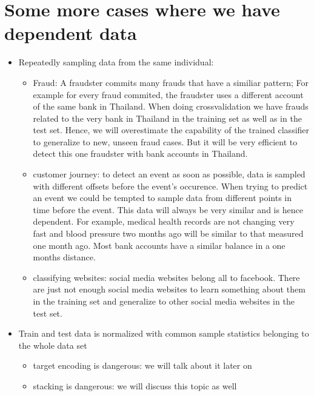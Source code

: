 \documentclass[letterpaper,10pt,english]{jupyterBook}
\begin{document}
\section{Some more cases where we have dependent data}
\label{\detokenize{dependent_data:some-more-cases-where-we-have-dependent-data}}\begin{itemize}
\item {} 
\sphinxAtStartPar
Repeatedly sampling data from the same individual:
\begin{itemize}
\item {} 
\sphinxAtStartPar
Fraud: A fraudster commits many frauds that have a similiar pattern; For example for every fraud commited, the fraudster uses a different account of the same bank in Thailand. When doing cross\sphinxhyphen{}validation we have frauds related to the very bank in Thailand in the training set as well as in the test set. Hence, we will overestimate the capability of the trained classifier to generalize to new, unseen fraud cases. But it will be very efficient to detect this one fraudster with bank accounts in Thailand.

\item {} 
\sphinxAtStartPar
customer journey: to detect an event as soon as possible, data is sampled with different offsets before the event’s occurence. When trying to predict an event we could be tempted to sample data from different points in time before the event. This data will always be very similar and is hence dependent. For example, medical health records are not changing very fast and blood pressure two months ago will be similar to that measured one month ago. Most bank accounts have a similar balance in a one months distance.

\item {} 
\sphinxAtStartPar
classifying websites: social media websites belong all to facebook. There are just not enough social media websites to learn something about them in the training set and generalize to other social media websites in the test set.

\end{itemize}

\item {} 
\sphinxAtStartPar
Train and test data is normalized with common sample statistics belonging to the whole data set
\begin{itemize}
\item {} 
\sphinxAtStartPar
target encoding is dangerous: we will talk about it later on

\item {} 
\sphinxAtStartPar
stacking is dangerous: we will discuss this topic as well

\end{itemize}

\end{itemize}
\end{document}
